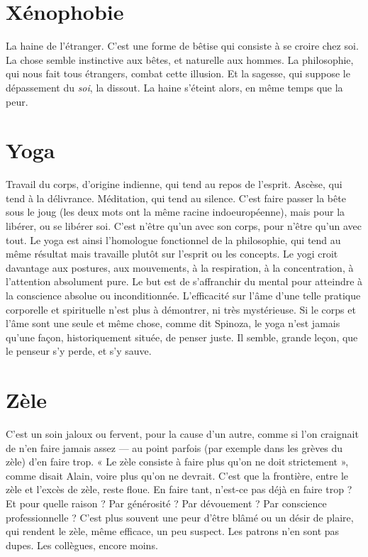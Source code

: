 \section{Xénophobie}
La haine de l'étranger. C’est une forme de bêtise qui consiste
à se croire chez soi. La chose semble instinctive aux bêtes, et
naturelle aux hommes. La philosophie, qui nous fait tous étrangers, combat
cette illusion. Et la sagesse, qui suppose le dépassement du {\it soi}, la dissout. La
haine s’éteint alors, en même temps que la peur.

\section{Yoga}
Travail du corps, d’origine indienne, qui tend au repos de l'esprit.
Ascèse, qui tend à la délivrance. Méditation, qui tend au silence.
C’est faire passer la bête sous le joug (les deux mots ont la même racine indoeuropéenne),
mais pour la libérer, ou se libérer soi. C’est n’être qu’un avec son
corps, pour n'être qu’un avec tout. Le yoga est ainsi l’homologue fonctionnel de
la philosophie, qui tend au même résultat mais travaille plutôt sur l'esprit ou les
concepts. Le yogi croit davantage aux postures, aux mouvements, à la respiration,
à la concentration, à l'attention absolument pure. Le but est de s’affranchir du
mental pour atteindre à la conscience absolue ou inconditionnée. L'efficacité sur
l’âme d’une telle pratique corporelle et spirituelle n’est plus à démontrer, ni très
mystérieuse. Si le corps et l’âme sont une seule et même chose, comme dit Spinoza,
le yoga n’est jamais qu’une façon, historiquement située, de penser juste. Il
semble, grande leçon, que le penseur s’y perde, et s’y sauve.

\section{Zèle}
C’est un soin jaloux ou fervent, pour la cause d’un autre, comme si
l’on craignait de n’en faire jamais assez — au point parfois (par exemple
dans les grèves du zèle) d’en faire trop. « Le zèle consiste à faire plus qu’on ne
doit strictement », comme disait Alain, voire plus qu’on ne devrait. C’est que
la frontière, entre le zèle et l’excès de zèle, reste floue. En faire tant, n’est-ce pas
déjà en faire trop ? Et pour quelle raison ? Par générosité ? Par dévouement ?
Par conscience professionnelle ? C’est plus souvent une peur d’être blâmé ou
un désir de plaire, qui rendent le zèle, même efficace, un peu suspect. Les
patrons n’en sont pas dupes. Les collègues, encore moins.

